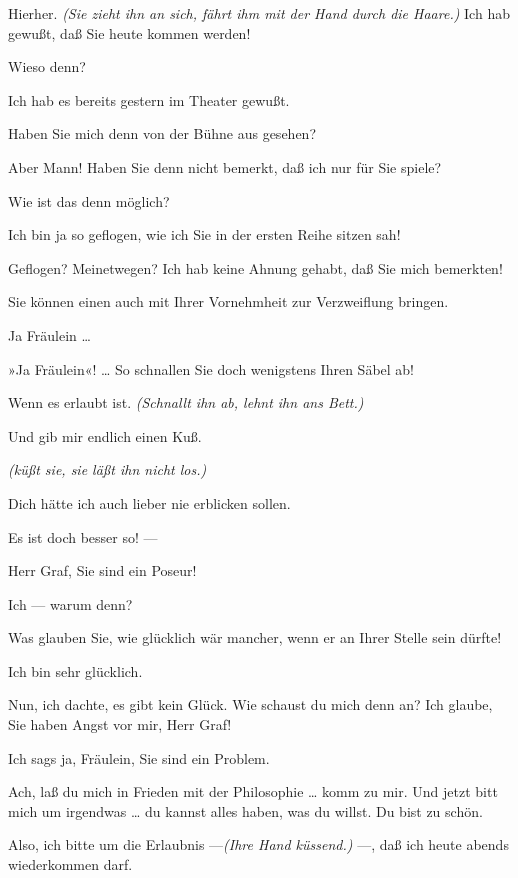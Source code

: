 \documentclass[
	final,
	a4paper,
	ngerman,
	mpinclude = true, %
	twoside = true,
	open = right,
	cleardoublepage = plain,
	DIV = 13,
	BCOR = 1cm,
	titlepage = firstiscover,
	]{scrbook}
\newcommand{\direction}[1]{\textit{(#1)}}
\newcommand{\thecharacter}[1]{\textup{\textsc{#1}}}
\newcommand{\theschauspielerin}{\thecharacter{Schauspielerin}}
\newcommand{\thegraf}{\thecharacter{Graf}}
\newcommand{\character}[1]{\item[#1:]}
\newcommand{\schauspielerin}{\character{\theschauspielerin}}
\newcommand{\graf}{\character{\thegraf}}
\begin{document}
\begin{play}
	\schauspielerin
	Hierher. \direction{Sie zieht ihn an sich, fährt ihm mit der Hand durch die Haare.} Ich hab gewußt, daß Sie heute kommen werden!

	\graf
	Wieso denn?

	\schauspielerin
	Ich hab es bereits gestern im Theater gewußt.

	\graf
	Haben Sie mich denn von der Bühne aus gesehen?

	\schauspielerin
	Aber Mann! Haben Sie denn nicht bemerkt, daß ich nur für Sie spiele?

	\graf
	Wie ist das denn möglich?

	\schauspielerin
	Ich bin ja so geflogen, wie ich Sie in der ersten Reihe sitzen sah!

	\graf
	Geflogen? Meinetwegen? Ich hab keine Ahnung gehabt, daß Sie mich bemerkten!

	\schauspielerin
	Sie können einen auch mit Ihrer Vornehmheit zur Verzweiflung bringen.

	\graf
	Ja Fräulein \ldots{}

	\schauspielerin
	»Ja Fräulein«! \ldots{} So schnallen Sie doch wenigstens Ihren Säbel ab!

	\graf
	Wenn es erlaubt ist. \direction{Schnallt ihn ab, lehnt ihn ans Bett.}

	\schauspielerin
	Und gib mir endlich einen Kuß.

	\graf
	\direction{küßt sie, sie läßt ihn nicht los.}

	\schauspielerin
	Dich hätte ich auch lieber nie erblicken sollen.

	\graf
	Es ist doch besser so! ---

	\schauspielerin
	Herr Graf, Sie sind ein Poseur!

	\graf
	Ich --- warum denn?

	\schauspielerin
	Was glauben Sie, wie glücklich wär mancher, wenn er an Ihrer Stelle sein dürfte!

	\graf
	Ich bin sehr glücklich.

	\schauspielerin
	Nun, ich dachte, es gibt kein Glück. Wie schaust du mich denn an? Ich glaube, Sie haben Angst vor mir, Herr Graf!

	\graf
	Ich sags ja, Fräulein, Sie sind ein Problem.

	\schauspielerin
	Ach, laß du mich in Frieden mit der Philosophie \ldots{} komm zu mir. Und jetzt bitt mich um irgendwas \ldots{} du kannst alles haben, was du willst. Du bist zu schön.

	\graf
	Also, ich bitte um die Erlaubnis ---\direction{Ihre Hand küssend.} ---, daß ich heute abends wiederkommen darf.


\end{play}
\end{document}
